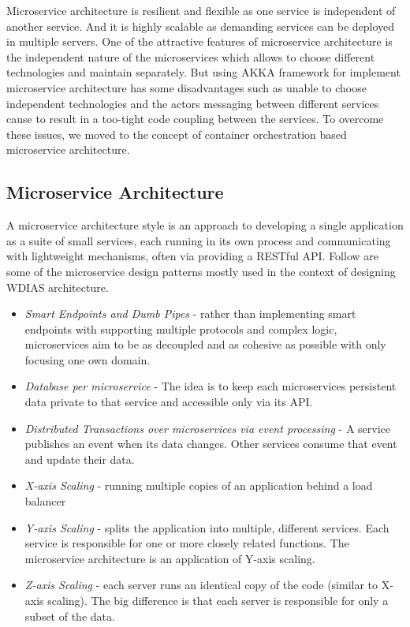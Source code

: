 \documentclass[conference]{IEEEtran}
\begin{document}
Microservice architecture is resilient and flexible as one service is independent of another service. And it is highly scalable as demanding services can be deployed in multiple servers. One of the attractive features of microservice architecture is the independent nature of the microservices which allows to choose different technologies and maintain separately. But using AKKA framework for implement microservice architecture has some disadvantages such as unable to choose independent technologies and the actors messaging between different services cause to result in a too-tight code coupling between the services. To overcome these issues, we moved to the concept of container orchestration based microservice architecture.

\subsection{Microservice Architecture}
\label{psubse:microservice_architecture}

A microservice architecture style is an approach to developing a single application as
a suite of small services, each running in its own process and communicating with
lightweight mechanisms, often via providing a RESTful API. Follow are some of the microservice design patterns mostly used in the context of designing WDIAS architecture.
\begin{itemize}
    \item \emph{Smart Endpoints and Dumb Pipes} - rather than implementing smart endpoints with supporting multiple protocols and complex logic, microservices aim to be as decoupled and as cohesive as possible with only focusing one own domain.
    \item \emph{Database per microservice} - The idea is to keep each microservices persistent data private to that service and accessible only via its API.
    \item \emph{Distributed Transactions over microservices via event processing} - A service publishes an event when its data changes. Other services consume that event and update their data.
    \item \emph{X-axis Scaling} -  running multiple copies of an application behind a load balancer
    \item \emph{Y-axis Scaling} - splits the application into multiple, different services. Each service is responsible for one or more closely related functions. The microservice architecture is an application of Y-axis scaling.
    \item \emph{Z-axis Scaling} - each server runs an identical copy of the code (similar to X-axis scaling). The big difference is that each server is responsible for only a subset of the data.
\end{itemize}
\end{document}
